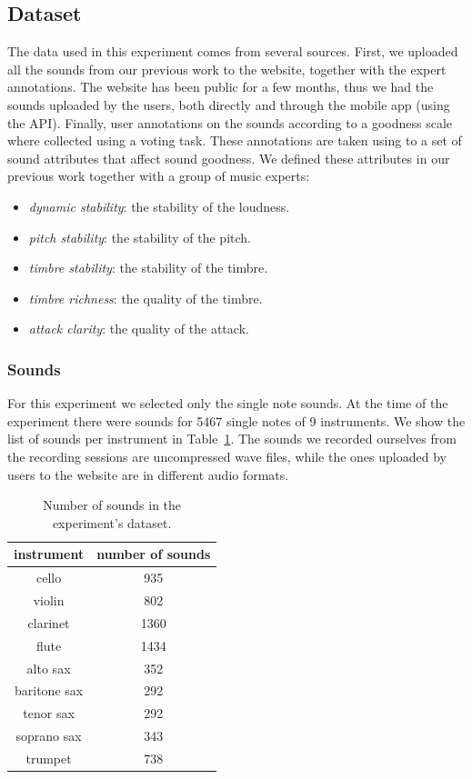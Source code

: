 \documentclass{article}
\begin{document}
\subsection{Dataset}
The data used in this experiment comes from several sources. First, we uploaded all the sounds from our previous work to the website, together with the expert annotations. The website has been public for a few months, thus we had the sounds uploaded by the users, both directly and through the mobile app (using the API). Finally, user annotations on the sounds according to a goodness scale where collected using a voting task. These annotations are taken using to a set of sound attributes that affect sound goodness. We defined these attributes in our previous work together with a group of music experts:   
\begin{itemize}
	\item{\textit{dynamic stability}: the stability of the loudness.}
	\item{\textit{pitch stability}: the stability of the pitch.}
	\item{\textit{timbre stability}: the stability of the timbre.}
	\item{\textit{timbre richness}: the quality of the timbre.}
	\item{\textit{attack clarity}: the quality of the attack.}
\end{itemize}

\subsubsection{Sounds}
For this experiment we selected only the single note sounds. At the time of the experiment there were sounds for 5467 single notes of 9 instruments. We show the list of sounds per instrument in Table~\ref{sounds}. The sounds we recorded ourselves from the recording sessions are uncompressed wave files, while the ones uploaded by users to the website are in different audio formats.  

\begin{table}[ht]
\centering
\begin{tabular}{cc}
\hline
instrument   & number of sounds \\ \hline
cello        & 935              \\
violin       & 802              \\
clarinet     & 1360             \\
flute        & 1434             \\
alto sax     & 352              \\
baritone sax & 292              \\
tenor sax    & 292              \\
soprano sax  & 343              \\
trumpet      & 738              \\ \hline
\end{tabular}
\caption{Number of sounds in the experiment's dataset.}
\label{sounds}
\end{table}
\end{document}
